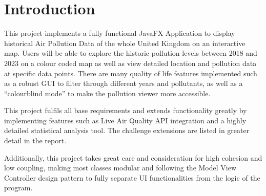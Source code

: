 \section{Introduction}
This project implements a fully functional JavaFX Application to display historical Air Pollution Data of the whole United Kingdom on an interactive map. Users will be able to explore the historic pollution levels between 2018 and 2023 on a colour coded map as well as view detailed location and pollution data at specific data points. There are many quality of life features implemented such as a robust GUI to filter through different years and pollutants, as well as a “colourblind mode” to make the pollution viewer more accessible. 

This project fulfils all base requirements and extends functionality greatly by implementing features such as Live Air Quality API integration and a highly detailed statistical analysis tool. The challenge extensions are listed in greater detail in the report. 

Additionally, this project takes great care and consideration for high cohesion and low coupling, making most classes modular and following the Model View Controller design pattern to fully separate UI functionalities from the logic of the program.